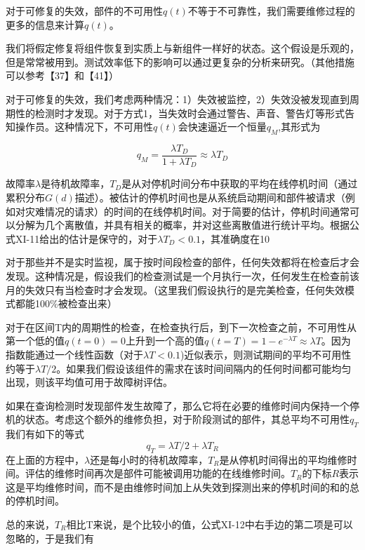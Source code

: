 \documentclass[cn,11pt,chinese]{elegantbook}
\begin{document}
{对于可修复的失效，部件的不可用性$q(t)$不等于不可靠性，我们需要维修过程的更多的信息来计算$q(t)$。

我们将假定修复将组件恢复到实质上与新组件一样好的状态。这个假设是乐观的，但是常常被用到。测试效率低下的影响可以通过更复杂的分析来研究。（其他措施可以参考【37】和【41】）

对于可修复的失效，我们考虑两种情况：1）失效被监控，2）失效没被发现直到周期性的检测时才发现。对于方式1，当失效时会通过警告、声音、警告灯等形式告知操作员。这种情况下，不可用性$q(t)$会快速逼近一个恒量$q_M$,其形式为

\begin{equation}\label{eq11-11}
q_M=\frac{\lambda T_D}{1+\lambda T_D} \approx \lambda T_D
\end{equation}

故障率$\lambda$是待机故障率，$T_D$是从对停机时间分布中获取的平均在线停机时间（通过累积分布$G(d)$描述）。被估计的停机时间也是从系统启动期间和部件被请求（例如对灾难情况的请求）的时间的在线停机时间。对于简要的估计，停机时间通常可以分解为几个离散值，并具有相关的概率，并对这些离散值进行统计平均。根据公式XI-11给出的估计是保守的，对于$\lambda T_D <0.1$，其准确度在10%

对于那些并不是实时监视，属于按时间段检查的部件，任何失效都将在检查后才会发现。这种情况是，假设我们的检查测试是一个月执行一次，任何发生在检查前该月的失效只有当检查时才会发现。（这里我们假设执行的是完美检查，任何失效模式都能100\%被检查出来）

对于在区间T内的周期性的检查，在检查执行后，到下一次检查之前，不可用性从第一个低的值$q(t=0)=0$上升到一个高的值$q(t=T)=1-e^{-\lambda T} \approx \lambda T$。因为指数能通过一个线性函数（对于$\lambda T<0.1$)近似表示，则测试期间的平均不可用性约等于$\lambda T/2$。如果我们假设该组件的需求在该时间间隔内的任何时间都可能均匀出现，则该平均值可用于故障树评估。

如果在查询检测时发现部件发生故障了，那么它将在必要的维修时间内保持一个停机的状态。考虑这个额外的维修负担，对于阶段测试的部件，其总平均不可用性$q_T$我们有如下的等式
\begin{equation}\label{eq11-12}
q_T=\lambda T/2+\lambda T_R
\end{equation}
在上面的方程中，$\lambda$还是每小时的待机故障率，$T_R$是从停机时间得出的平均维修时间。评估的维修时间再次是部件可能被调用功能的在线维修时间。$T_R$的下标$R$表示这是平均维修时间，而不是由维修时间加上从失效到探测出来的停机时间的和的总的停机时间。

总的来说，$T_R$相比T来说，是个比较小的值，公式XI-12中右手边的第二项是可以忽略的，于是我们有

}
\end{document}
